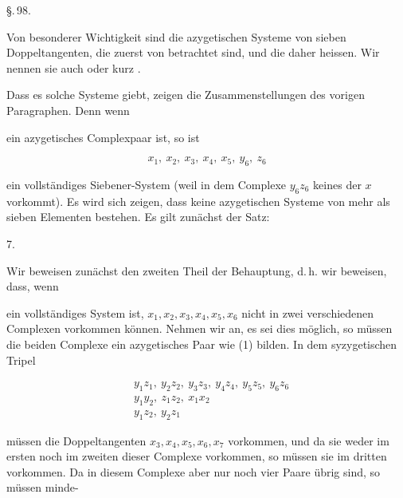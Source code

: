 \S.\,98.


Von besonderer Wichtigkeit sind die azygetischen Systeme von sieben Doppeltangenten, die zuerst von  betrachtet sind, und die daher  heissen. Wir nennen sie auch  oder kurz .

Dass es solche Systeme giebt, zeigen die Zusammenstellungen des vorigen Paragraphen. Denn wenn


ein azygetisches Complexpaar ist, so ist

\[ x_1,\ x_2,\ x_3,\ x_4,\ x_5,\ y_6,\ z_6 \]

ein vollständiges Siebener-System (weil in dem Complexe $y_6 z_6$ keines der $x$ vorkommt). Es wird sich zeigen, dass keine azygetischen Systeme von mehr als sieben Elementen bestehen. Es gilt zunächst der Satz:

7. 

Wir beweisen zunächst den zweiten Theil der Behauptung, d.\,h. wir beweisen, dass, wenn


ein vollständiges System ist, $x_1, x_2, x_3, x_4, x_5, x_6$ nicht in zwei verschiedenen Complexen vorkommen können. Nehmen wir an, es sei dies möglich, so müssen die beiden Complexe ein azygetisches Paar wie (1) bilden. In dem syzygetischen Tripel

\[\begin{aligned}
&y_1 z_1,\ y_2 z_2,\ y_3 z_3,\ y_4 z_4,\ y_5 z_5,\ y_6 z_6\\
&y_1 y_2,\ z_1 z_2,\ x_1 x_2\\
&y_1 z_2,\ y_2 z_1
\end{aligned}\]

müssen die Doppeltangenten $x_3, x_4, x_5, x_6, x_7$ vorkommen, und da sie weder im ersten noch im zweiten dieser Complexe vorkommen, so müssen sie im dritten vorkommen. Da in diesem Complexe aber nur noch vier Paare übrig sind, so müssen minde-
